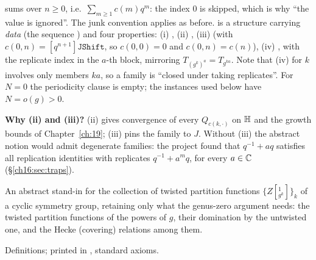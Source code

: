 \begin{dictionary}
 sums  over $n\ge0$, i.e.\ $\sum_{m\ge1}c(m)q^m$: the index $0$ is
skipped, which is why ``the value  is ignored''.  The  junk convention applies as before.
 is a structure carrying \emph{data} (the sequence ) and four properties: (i)
, (ii) , (iii)  (with $c(0,n)=[q^{n+1}]\mathtt{JShift}$, so $c(0,0)=0$ and
$c(0,n)=c(n)$), (iv) , with the replicate index  in the $a$-th block, mirroring
$T_{(g^k)^a}=T_{g^{ka}}$.  Note that (iv) for $k$ involves only members $ka$, so a family is ``closed under taking
replicates''.  For $N=0$ the periodicity clause is empty; the instances used below have $N=o(g)>0$.

\textbf{Why (ii) and (iii)?}  (ii) gives convergence of every $Q_{c(k,\cdot)}$ on $\mathbb{H}$ and the growth bounds of
Chapter~\ref{ch:19}; (iii) pins the family to $J$.  Without (iii) the abstract notion would admit degenerate
families: the project found that $q^{-1}+aq$ satisfies all replication identities with replicates $q^{-1}+a^mq$, for
every $a\in{\mathbb{C}}$ (\S\ref{ch16:sec:traps}).
\end{dictionary}
\begin{physics}
An abstract stand-in for the collection of twisted partition functions $\{Z[{}^1_{g^k}]\}_k$ of a cyclic symmetry
group, retaining only what the genus-zero argument needs: the twisted partition functions of the powers of $g$, their
domination by the untwisted one, and the Hecke (covering) relations among them.
\end{physics}
\begin{status}
Definitions; printed in , standard axioms.
\end{status}

